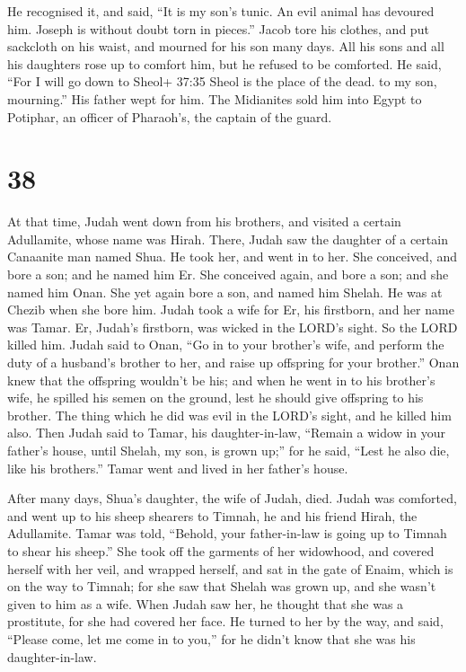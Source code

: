  He recognised it, and said, ``It is my son's tunic. An
evil animal has devoured him. Joseph is without doubt torn in pieces.''
 Jacob tore his clothes, and put sackcloth on his waist,
and mourned for his son many days.  All his sons and all
his daughters rose up to comfort him, but he refused to be comforted. He
said, ``For I will go down to Sheol+ 37:35 Sheol is the place of the
dead. to my son, mourning.'' His father wept for him.  The
Midianites sold him into Egypt to Potiphar, an officer of Pharaoh's, the
captain of the guard.

\hypertarget{section-37}{%
\section{38}\label{section-37}}

 At that time, Judah went down from his brothers, and
visited a certain Adullamite, whose name was Hirah.  There,
Judah saw the daughter of a certain Canaanite man named Shua. He took
her, and went in to her.  She conceived, and bore a son; and
he named him Er.  She conceived again, and bore a son; and
she named him Onan.  She yet again bore a son, and named him
Shelah. He was at Chezib when she bore him.  Judah took a
wife for Er, his firstborn, and her name was Tamar.  Er,
Judah's firstborn, was wicked in the LORD's sight. So the LORD killed
him.  Judah said to Onan, ``Go in to your brother's wife,
and perform the duty of a husband's brother to her, and raise up
offspring for your brother.''  Onan knew that the offspring
wouldn't be his; and when he went in to his brother's wife, he spilled
his semen on the ground, lest he should give offspring to his brother.
 The thing which he did was evil in the LORD's sight, and
he killed him also.  Then Judah said to Tamar, his
daughter-in-law, ``Remain a widow in your father's house, until Shelah,
my son, is grown up;'' for he said, ``Lest he also die, like his
brothers.'' Tamar went and lived in her father's house.

 After many days, Shua's daughter, the wife of Judah, died.
Judah was comforted, and went up to his sheep shearers to Timnah, he and
his friend Hirah, the Adullamite.  Tamar was told,
``Behold, your father-in-law is going up to Timnah to shear his sheep.''
 She took off the garments of her widowhood, and covered
herself with her veil, and wrapped herself, and sat in the gate of
Enaim, which is on the way to Timnah; for she saw that Shelah was grown
up, and she wasn't given to him as a wife.  When Judah saw
her, he thought that she was a prostitute, for she had covered her face.
 He turned to her by the way, and said, ``Please come, let
me come in to you,'' for he didn't know that she was his
daughter-in-law.

